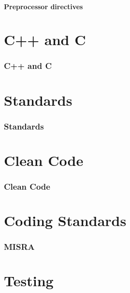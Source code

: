 \documentclass{beamer}
\begin{document}
\subsection{Preprocessor directives}
\begin{frame}

\end{frame}


\part{C++ and C}
\section{C++ and C}
\begin{frame}

\end{frame}

\part{Standards}
\section{Standards}
\begin{frame}

\end{frame}


\part{Clean Code}
\section{Clean Code}
\begin{frame}

\end{frame}


\part{Coding Standards}
\section{MISRA}
\begin{frame}

\end{frame}


\part{Testing}
\end{document}
